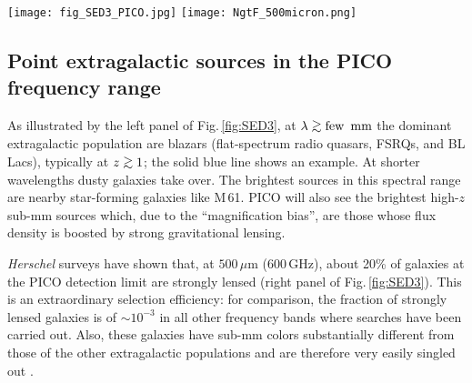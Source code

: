 \documentclass[11pt,a4paper]{article}
\def\simgt{\mathrel{\rlap{\lower 3pt\hbox{$\sim$}} \raise2.0pt\hbox{$>$}}}
\begin{document}







\def\mission{CMB Probe\ }




\begin{figure*}
\begin{center}
\texttt{[image: fig\_SED3\_PICO.jpg]}
\texttt{[image: NgtF\_500micron.png]}
\caption{\textbf{Left panel.} Examples of SEDs of extragalactic sources detectable by PICO,
compared with its point source detection limits (solid black line). The SED of M\,61 has been scaled down by a
factor of 10. The 90\% completeness limits of the Second \textit{Planck} Catalogue of Compact Sources (PCCS2; \cite{PCCS2})
are also shown.  \textbf{Right panel.} Integral counts of the various populations of extragalactic sources at
$500\,\mu$m as determined by \textit{Herschel} surveys. The vertical red line shows the estimated PICO detection limit.}
\label{fig:SED3}
\end{center}
\end{figure*}

\subsection{Point extragalactic sources in the PICO frequency range}

As illustrated by the left panel of Fig.\,\ref{fig:SED3}, at $\lambda \simgt
\hbox{few\, mm}$ the  dominant extragalactic population are blazars
(flat-spectrum radio quasars, FSRQs, and BL Lacs), typically at $z\simgt 1$;
the solid blue line shows an example. At shorter wavelengths dusty galaxies
take over. The brightest sources in this spectral range are nearby
star-forming galaxies like M\,61. PICO will also see the brightest high-$z$
sub-mm sources which, due to the ``magnification bias'', are those whose flux
density is boosted by strong gravitational lensing.

\textit{Herschel} surveys have shown that, at $500\,\mu$m (600\,GHz), about
20\% of galaxies  at the PICO detection limit are strongly lensed (right panel
of Fig.\,\ref{fig:SED3}). This is an extraordinary selection efficiency: for
comparison, the fraction of strongly lensed galaxies is of $\sim 10^{-3}$ in
all other frequency bands where searches have been carried out. Also, these
galaxies have sub-mm colors substantially different from those of the other
extragalactic populations and are therefore very easily singled out
\cite{Negrello2017lensed}.
\end{document}
